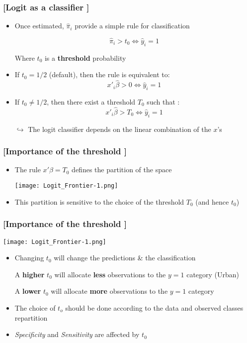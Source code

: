\documentclass[xcolor=x11names,compress, aspectratio=169]{beamer}
\renewcommand{\(}{\begin{columns}}
\renewcommand{\)}{\end{columns}}
\newcommand{\<}[1]{\begin{column}{#1}}
\renewcommand{\>}{\end{column}}
\begin{document}
\begin{frame} %
\frametitle{\textcolor{brique}{[Logit as a classifier ]}}
\pause
 \begin{itemize}[<+->]
  \item Once estimated, $\widehat \pi_i$ provide a simple rule for classification
  \item[] $$
   \widehat \pi_i > t_0  \Leftrightarrow \widehat y_i = 1
  $$
    \item[] Where $t_0$ is a \textbf{threshold} probability
  \item If  $t_0 = 1/2$ (default), then the rule is equivalent to:
   $$
   x'_i \widehat \beta > 0  \Leftrightarrow \widehat y_i = 1
  $$
  \item If  $t_0 \neq 1/2$, then there exist a threshold $T_0$ such that :
   $$
   x'_i \widehat \beta > T_0  \Leftrightarrow \widehat y_i = 1
  $$
  \item[$\hookrightarrow$] The logit classifier depends on the linear combination of the $x$'s
\end{itemize}
\end{frame}

\begin{frame} %
\frametitle{\textcolor{brique}{[Importance of the threshold ]}}
\pause
 \begin{itemize}[<+->]
  \item The rule $ x'\beta = T_0$ defines the partition of the space
  \item[] \begin{center}\texttt{[image: Logit\_Frontier-1.png]} \end{center}
  \item This partition is sensitive to the choice of the threshold $T_0$ (and hence $t_0$)
\end{itemize}
\end{frame}


\begin{frame} %
\frametitle{\textcolor{brique}{[Importance of the threshold ]}}
 \begin{center}\texttt{[image: Logit\_Frontier-1.png]} \end{center}
\pause
 \begin{itemize}
  \item Changing $t_0$ will  change the predictions \&  the classification
  \item[] A \textbf{higher} $t_0$ will allocate \textbf{less} observations to the $y=1$ category (Urban)
  \item[] A \textbf{lower} $t_0$ will allocate \textbf{ more } observations to the $y=1$ category
  \item The choice of $t_o$ should be done according to the data and observed classes repartition
  \item \textit{Specificity} and \textit{Sensitivity} are affected by $t_0$
\end{itemize}
\end{frame}
\end{document}
